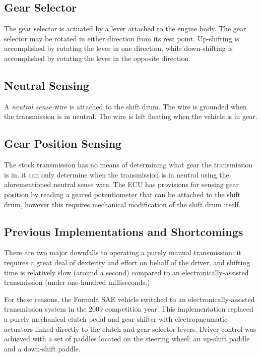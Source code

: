 \subsection{Gear Selector}

The gear selector is actuated by a lever attached to the engine body. The gear selector may be rotated in either direction from its rest point. Up-shifting is accomplished by rotating the lever in one direction, while down-shifting is accomplished by rotating the lever in the opposite direction. 

\subsection{Neutral Sensing}

A \emph{neutral sense} wire is attached to the shift drum. The wire is grounded when the transmission is in neutral. The wire is left floating when the vehicle is in gear. 

\subsection{Gear Position Sensing}

The stock transmission has no means of determining what gear the transmission is in; it can only determine when the transmission is in neutral using the aforementioned neutral sense wire. The ECU has provisions for sensing gear position by reading a geared potentiometer that can be attached to the shift drum, however this requires mechanical modification of the shift drum itself.

\subsection{Previous Implementations and Shortcomings}

There are two major downfalls to operating a purely manual transmission: it requires a great deal of dexterity and effort on behalf of the driver, and shifting time is relatively slow (around a second) compared to an electronically-assisted transmission (under one-hundred milliseconds.) 

For these reasons, the Formula SAE vehicle switched to an electronically-assisted transmission system in the 2009 competition year. This implementation replaced a purely mechanical clutch pedal and gear shifter with electropneumatic actuators linked directly to the clutch and gear selector levers. Driver control was achieved with a set of paddles located on the steering wheel: an up-shift paddle and a down-shift paddle.

